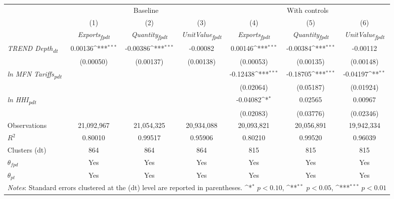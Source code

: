 {
\def\sym#1{\ifmmode^{#1}\else\(^{#1}\)\fi}
\begin{tabular}{l*{6}{c}}
\toprule
&\multicolumn{3}{c}{Baseline}&\multicolumn{3}{c}{With controls}\\\cmidrule(lr){2-4}\cmidrule(lr){5-7}
&(1)&(2)&(3)&(4)&(5)&(6)\\
&\textit{Exports\textsubscript{fpdt}}&\textit{Quantity\textsubscript{fpdt}}&\textit{UnitValue\textsubscript{fpdt}}&\textit{Exports\textsubscript{fpdt}}&\textit{Quantity\textsubscript{fpdt}}&\textit{UnitValue\textsubscript{fpdt}}\\
\midrule
\textit{TREND Depth\textsubscript{dt}} & 0.00136\sym{***} & -0.00386\sym{***} & -0.00082 & 0.00146\sym{***} & -0.00384\sym{***} & -0.00112\\
 & (0.00050) & (0.00137) & (0.00138) & (0.00053) & (0.00135) & (0.00148)\\
\addlinespace
\textit{ln MFN Tariffs\textsubscript{pdt}} &  &  &  & -0.12438\sym{***} & -0.18705\sym{***} & -0.04197\sym{**}\\
 &  &  &  & (0.02064) & (0.05187) & (0.01924)\\
\addlinespace
\textit{ln HHI\textsubscript{pdt}} &  &  &  & -0.04082\sym{*} & 0.02565 & 0.00967\\
 &  &  &  & (0.02083) & (0.03776) & (0.02346)\\
\midrule
Observations & 21,092,967 & 21,054,325 & 20,934,088 & 20,093,821 & 20,056,891 & 19,942,334\\
$R^{2}$ & 0.80010 & 0.99517 & 0.95906 & 0.80210 & 0.99520 & 0.96039\\
Clusters (dt) & 864 & 864 & 864 & 815 & 815 & 815\\
$\theta_{fpd}$ & Yes & Yes & Yes & Yes & Yes & Yes\\
$\theta_{pt}$ & Yes & Yes & Yes & Yes & Yes & Yes\\
\bottomrule
\multicolumn{7}{l}{\footnotesize \textit{Notes}: Standard errors clustered at the (dt) level are reported in parentheses. \sym{*} \(p<0.10\), \sym{**} \(p<0.05\), \sym{***} \(p<0.01\)}\\
\end{tabular}
}
